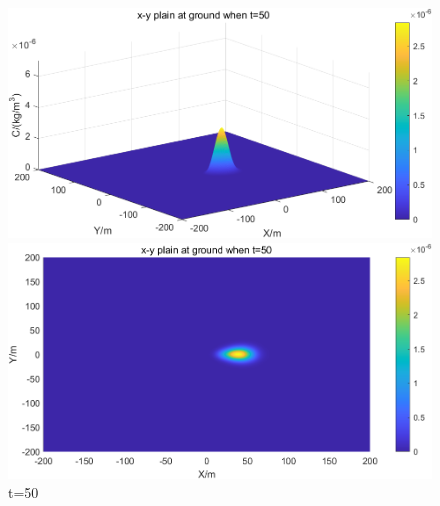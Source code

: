 \documentclass{article}
\begin{document}
	\begin{figure}[htbp]
		\begin{minipage}{0.49\textwidth}
			\includegraphics[width=\textwidth]{pics/default,t=50,3D.png}
		\end{minipage}
		\begin{minipage}{0.49\textwidth}
			\includegraphics[width=\textwidth]{pics/default,t=50,2D.png}
		\end{minipage}
		\caption{t=50}
		\label{fig1}
	\end{figure}
	
\end{document}
